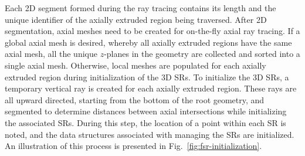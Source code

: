 Each 2D segment formed during the ray tracing contains its length and the unique identifier of the axially extruded region being traversed. After 2D segmentation, axial meshes need to be created for on-the-fly axial ray tracing. If a global axial mesh is desired, whereby all axially extruded regions have the same axial mesh, all the unique $z$-planes in the geometry are collected and sorted into a single axial mesh. Otherwise, local meshes are populated for each axially extruded region during initialization of the 3D \ac{SR}s. To initialize the 3D \ac{SR}s, a temporary vertical ray is created for each axially extruded region. These rays are all upward directed, starting from the bottom of the root geometry, and segmented to determine distances between axial intersections while initializing the associated \ac{SR}s. During this step, the location of a point within each \ac{SR} is noted, and the data structures associated with managing the \ac{SR}s are initialized. An illustration of this process is presented in Fig.~\ref{fig:fsr-initialization}.


